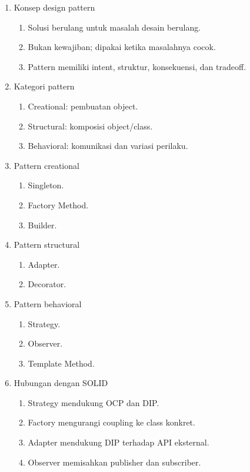 \begin{enumerate}
    \item Konsep design pattern
    \begin{enumerate}
        \item Solusi berulang untuk masalah desain berulang.
        \item Bukan kewajiban; dipakai ketika masalahnya cocok.
        \item Pattern memiliki intent, struktur, konsekuensi, dan tradeoff.
    \end{enumerate}
    \item Kategori pattern
    \begin{enumerate}
        \item Creational: pembuatan object.
        \item Structural: komposisi object/class.
        \item Behavioral: komunikasi dan variasi perilaku.
    \end{enumerate}
    \item Pattern creational
    \begin{enumerate}
        \item Singleton.
        \item Factory Method.
        \item Builder.
    \end{enumerate}
    \item Pattern structural
    \begin{enumerate}
        \item Adapter.
        \item Decorator.
    \end{enumerate}
    \item Pattern behavioral
    \begin{enumerate}
        \item Strategy.
        \item Observer.
        \item Template Method.
    \end{enumerate}
    \item Hubungan dengan SOLID
    \begin{enumerate}
        \item Strategy mendukung OCP dan DIP.
        \item Factory mengurangi coupling ke class konkret.
        \item Adapter mendukung DIP terhadap API eksternal.
        \item Observer memisahkan publisher dan subscriber.
    \end{enumerate}
\end{enumerate}

